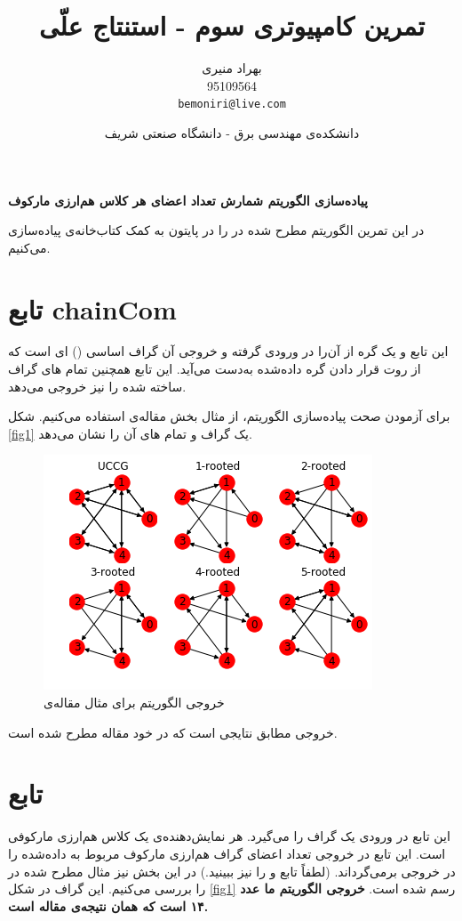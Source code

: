 \documentclass{article}
\title{تمرین کامپیوتری سوم - استنتاج علّی}
\author{بهراد منیری\\95109564\\ \texttt{bemoniri@live.com}}
\date{دانشکده‌ی مهندسی برق - دانشگاه صنعتی شریف}
\begin{document}
\maketitle
\begin{center}
\begin{Large}\textbf{ 
 پیاده‌سازی الگوریتم شمارش تعداد اعضای هر کلاس هم‌ارزی مارکوف
}
\end{Large}
\end{center}


در این تمرین الگوریتم مطرح شده در 
\cite{count}
را در پایتون به کمک کتاب‌خانه‌‌ی
پیاده‌سازی می‌کنیم. 
\section{
تابع
	chainCom}
این تابع
و یک گره از آن‌را در ورودی گرفته و خروجی آن گراف اساسی () ای است که از روت قرار دادن گره داده‌شده به‌دست می‌آید. این تابع همچنین تمام
های گراف ساخته شده را نیز خروجی می‌دهد.

برای آزمودن صحت پیاده‌سازی الگوریتم، از مثال بخش 
 مقاله‌ی 
\cite{count}
استفاده می‌کنیم. شکل 
\eqref{fig1}
 یک گراف 
 و تمام 
 ‌های آن را نشان می‌دهد.
\begin{figure}[h!]
\includegraphics[scale=0.9]{chains.png}
\caption{خروجی الگوریتم‌ برای مثال مقاله‌ی
\cite{count}	
}
\label{fig1}
\end{figure}
خروجی مطابق نتایجی است که در خود مقاله مطرح شده است.

\section{تابع 
}
این تابع در ورودی یک گراف 
را می‌گیرد. هر 
نمایش‌دهنده‌ی یک کلاس هم‌ارزی مارکوفی است. این تابع در خروجی تعداد اعضای گراف هم‌ارزی مارکوف مربوط به 
داده‌شده را در خروجی برمی‌گرداند. (لطفاً تابع
و 
را نیز ببینید.)
در این‌ بخش نیز مثال مطرح شده در 
\cite{count}
را بررسی می‌کنیم. این گراف در شکل 
\eqref{fig1}
رسم شده است.
\textbf{ خروجی الگوریتم‌ ما عدد ۱۴ است که همان نتیجه‌ی مقاله است.}
\end{document}
